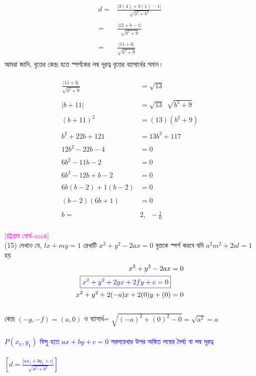 \documentclass{article}
\begin{document}
	\begin{align*}
		d=	&\frac{|3(4)+b(1)-1|}{\sqrt{3^2+b^2}}\\
		\\
		=	&	\frac{|12+b-1|}{\sqrt{b^2+9}}\\
		\\
		=	&	\frac{|11+b|}{\sqrt{b^2+9}}\\
	\end{align*}
	আমরা জানি, বৃত্তের কেন্দ্র হতে স্পর্শকের লম্ব দূরত্ব বৃত্তের ব্যাসার্ধের সমান। \\
	\\ 
	\begin{align*}
		\frac{|11+b|}{\sqrt{b^2+9}}&=\sqrt{13}\\
		\\
		|b+11|&=\sqrt{13}\,\,\,\sqrt{b^2+9}\\
		\\
		(b+11)^2&= (13)(b^2+9)\\
		\\
		b^2+22b+121&=13b^2+117\\
		\\
		12b^2-22b-4&=0\\
		\\
		6b^2-11b-2&=0\\
		\\
		6b^2-12b+b-2&=0\\
		\\
		6b(b-2)+1(b-2)&=0\\
		\\
		(b-2)(6b+1)&=0\\
		\\
		b=&2,\,\,\,-\frac{1}{6}
	\end{align*}
	\\ 
	\textcolor{magenta}{[চট্রগ্রাম বোর্ড-২০১৪]}\\
(15)	দেখাও যে, $lx+my=1$ রেখাটি $x^2+y^2-2ax=0$ বৃত্তকে স্পর্শ করবে যদি $a^2m^2+2al=1$ হয়\\
	\begin{align*}
		x^2+y^2-2ax&=0\\
		\boxed{\textcolor{blue}{x^2+y^2+2gx+2fy+c=0}}&\\
		x^2+y^2+2(-a)x+2(0)y+(0)&=0
	\end{align*}
	\\
	কেন্দ্র 	$(-g,-f)=(a,0)$ ও ব্যাসার্ধ= $\sqrt{(-a)^2+(0)^2-0}=\sqrt{a^2}=a$\\
	\\   
	\textcolor{blue}{$P(x_1,y_1)$ বিন্দু হতে  $ax+by+c=0$ সরলরেখার উপর অঙ্কিত লম্বের দৈর্ঘ্য বা লম্ব দূরত্ব \\
		\\
		$\left[d=\frac{|ax_1+by_1+c|}{\sqrt{a^2+b^2}}\right]$}\\
\end{document}
